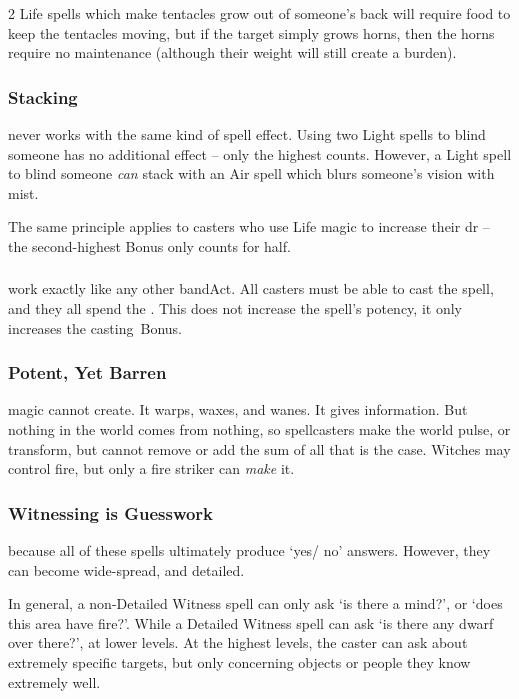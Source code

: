\begin{multicols}{2}
Life spells which make tentacles grow out of someone's back will require food to keep the tentacles moving, but if the target simply grows horns, then the horns require no maintenance (although their \gls{weight} will still create a burden).

\subsubsection{Stacking }
never works with the same kind of spell effect.
Using two Light \glspl{spell} to blind someone has no additional effect -- only the highest counts.
However, a Light spell to blind someone \textit{can} stack with an Air \gls{spell} which blurs someone's vision with mist.

The same principle applies to casters who use Life magic to increase their \gls{dr} -- the second-highest Bonus only counts for half.

\subsubsection{ }
work exactly like any other \gls{bandAct}.%
All casters must be able to cast the spell, and they all spend the .
This does not increase the spell's potency, it only increases the \gls{casting}~Bonus.

\subsubsection{Potent, Yet Barren}
magic cannot create.
It warps, waxes, and wanes.
It gives information.
But nothing in the world comes from nothing, so spellcasters make the world pulse, or transform, but cannot remove or add the sum of all that is the case.
Witches may control fire, but only a fire striker can \textit{make} it.

\subsubsection{Witnessing is Guesswork}
because all of these spells ultimately produce `yes/ no' answers.
However, they can become wide-spread, and detailed.

In general, a non-Detailed Witness spell can only ask `is there a mind?', or `does this \gls{area} have fire?'.
While a Detailed Witness spell can ask `is there any dwarf over there?', at lower levels.
At the highest levels, the caster can ask about extremely specific targets, but only concerning objects or people they know extremely well.


\end{multicols}
